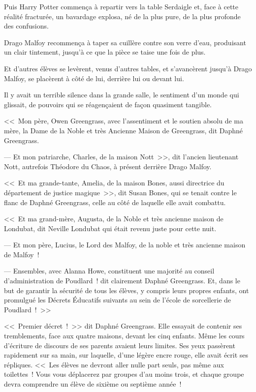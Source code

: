 Puis Harry Potter commença à repartir vers la table Serdaigle et, face à cette réalité fracturée, un bavardage explosa, né de la plus pure, de la plus profonde des confusions.

Drago Malfoy recommença à taper sa cuillère contre son verre d'eau, produisant un clair tintement, jusqu'à ce que la pièce se taise une fois de plus.

Et d'autres élèves se levèrent, venus d'autres tables, et s'avancèrent jusqu'à Drago Malfoy, se placèrent à côté de lui, derrière lui ou devant lui.

Il y avait un terrible silence dans la grande salle, le sentiment d'un monde qui glissait, de pouvoirs qui se réagençaient de façon quasiment tangible.

<<~Mon père, Owen Greengrass, avec l'assentiment et le soutien absolu de ma mère, la Dame de la Noble et très Ancienne Maison de Greengrass, dit Daphné Greengrass.

--- Et mon patriarche, Charles, de la maison Nott~>>, dit l'ancien lieutenant Nott, autrefois Théodore du Chaos, à présent derrière Drago Malfoy.

<<~Et ma grande-tante, Amelia, de la maison Bones, aussi directrice du département de justice magique~>>, dit Susan Bones, qui se tenait contre le flanc de Daphné Greengrass, celle au côté de laquelle elle avait combattu.

<<~Et ma grand-mère, Augusta, de la Noble et très ancienne maison de Londubat, dit Neville Londubat qui était revenu juste pour cette nuit.

--- Et mon père, Lucius, le Lord des Malfoy, de la noble et très ancienne maison de Malfoy~!

--- Ensembles, avec Alanna Howe, constituent une majorité au conseil d'administration de Poudlard~! dit clairement Daphné Greengrass. Et, dans le but de garantir la sécurité de tous les élèves, y compris leurs propres enfants, ont promulgué les Décrets Éducatifs suivants au sein de l'école de sorcellerie de Poudlard~!~>>

\later

<<~Premier décret~!~>> dit Daphné Greengrass. Elle essayait de contenir ses tremblements, face aux quatre maisons, devant les cinq enfants. Même les cours d'écriture de discours de ses parents avaient leurs limites. Ses yeux passèrent rapidement sur sa main, sur laquelle, d'une légère encre rouge, elle avait écrit ses répliques. <<~Les élèves ne devront aller nulle part seuls, pas même aux toilettes~! Vous vous déplacerez par groupes d'au moins trois, et chaque groupe devra comprendre un élève de sixième ou septième année~!

